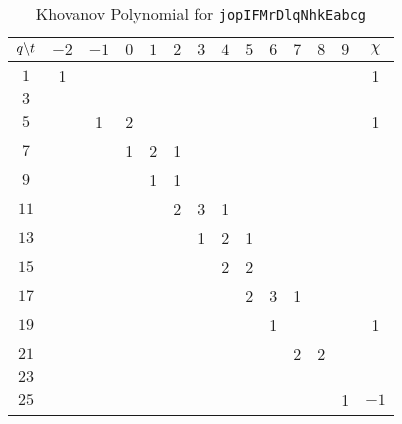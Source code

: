 \documentclass{article}
\theoremstyle{plain}
\begin{document}
        \begin{table}[H]
            \centering
            \begin{tabular}{| c | c | c | c | c | c | c | c | c | c | c | c | c | c |}
                \hline
                $q\symbol{92}t$&$-2$&$-1$&$0$&$1$&$2$&$3$&$4$&$5$&$6$&$7$&$8$&$9$&$\chi$\\
                \hline
                $1$&1&&&&&&&&&&&&1\\
                \hline
                $3$&&&&&&&&&&&&&\\
                \hline
                $5$&&1&2&&&&&&&&&&1\\
                \hline
                $7$&&&1&2&1&&&&&&&&\\
                \hline
                $9$&&&&1&1&&&&&&&&\\
                \hline
                $11$&&&&&2&3&1&&&&&&\\
                \hline
                $13$&&&&&&1&2&1&&&&&\\
                \hline
                $15$&&&&&&&2&2&&&&&\\
                \hline
                $17$&&&&&&&&2&3&1&&&\\
                \hline
                $19$&&&&&&&&&1&&&&1\\
                \hline
                $21$&&&&&&&&&&2&2&&\\
                \hline
                $23$&&&&&&&&&&&&&\\
                \hline
                $25$&&&&&&&&&&&&1&$-1$\\
                \hline
            \end{tabular}
            \caption{Khovanov Polynomial for \texttt{jopIFMrDlqNhkEabcg}}
            \label{table:jopIFMrDlqNhkEabcg_kho}
        \end{table}
    \newpage
\end{document}
